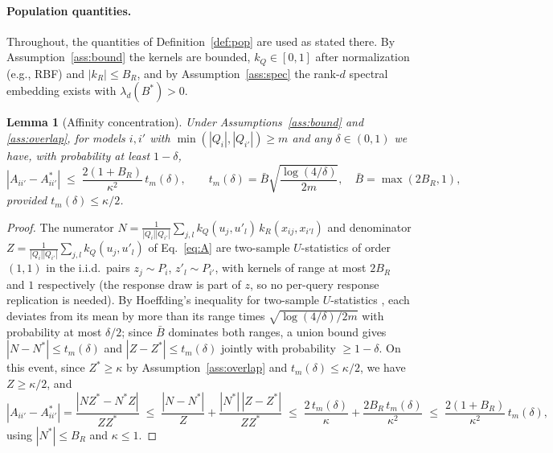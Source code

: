 \documentclass{article}
\newtheorem{lemma}{Lemma}
\theoremstyle{definition}
\theoremstyle{plain}
\begin{document}
\paragraph{Population quantities.} Throughout, the quantities of
Definition~\ref{def:pop} are used as stated there. By Assumption~\ref{ass:bound} the
kernels are bounded, $k_Q\in[0,1]$ after normalization (e.g., RBF) and $|k_R|\le B_R$,
and by Assumption~\ref{ass:spec} the rank-$d$ spectral embedding exists with
$\lambda_d(B^*)>0$.

\begin{lemma}[Affinity concentration]
\label{lem:conc}
Under Assumptions~\ref{ass:bound} and \ref{ass:overlap}, for models $i,i'$ with
$\min(|Q_i|,|Q_{i'}|)\ge m$ and any $\delta\in(0,1)$ we have, with probability at
least $1-\delta$,
\[
|A_{ii'}-A^*_{ii'}|\;\le\;\frac{2(1+B_R)}{\kappa^2}\,t_m(\delta),
\qquad t_m(\delta)=\bar B\sqrt{\frac{\log(4/\delta)}{2m}},\quad \bar B=\max(2B_R,1),
\]
provided $t_m(\delta)\le\kappa/2$.
\end{lemma}
\begin{proof}
\begin{sloppypar}
The numerator $N=\frac{1}{|Q_i||Q_{i'}|}\sum_{j,l}k_Q(u_j,u'_l)\,k_R(x_{ij},x_{i'l})$ and
denominator $Z=\frac{1}{|Q_i||Q_{i'}|}\sum_{j,l}k_Q(u_j,u'_l)$ of Eq.~\eqref{eq:A} are
two-sample $U$-statistics of order $(1,1)$ in the i.i.d.\ pairs $z_j\sim P_i$,
$z'_l\sim P_{i'}$, with kernels of range at most $2B_R$ and $1$ respectively (the
response draw is part of $z$, so no per-query response replication is needed). By
Hoeffding's inequality for two-sample $U$-statistics
\citep[Section~5]{hoeffding1963}, each deviates from its mean by more than its range times
$\sqrt{\log(4/\delta)/2m}$ with probability at most $\delta/2$; since $\bar B$ dominates
both ranges, a union bound gives $|N-N^*|\le t_m(\delta)$ and $|Z-Z^*|\le t_m(\delta)$
jointly with probability $\ge1-\delta$. On this event, since $Z^*\ge\kappa$ by Assumption~\ref{ass:overlap} and $t_m(\delta)\le\kappa/2$,
we have $Z\ge\kappa/2$, and
\[
|A_{ii'}-A^*_{ii'}|=\frac{|NZ^*-N^*Z|}{ZZ^*}
\;\le\;\frac{|N-N^*|}{Z}+\frac{|N^*|\,|Z-Z^*|}{ZZ^*}
\;\le\;\frac{2\,t_m(\delta)}{\kappa}+\frac{2B_R\,t_m(\delta)}{\kappa^2}
\;\le\;\frac{2(1+B_R)}{\kappa^2}\,t_m(\delta),
\]
using $|N^*|\le B_R$ and $\kappa\le1$.
\end{sloppypar}
\end{proof}
\end{document}
